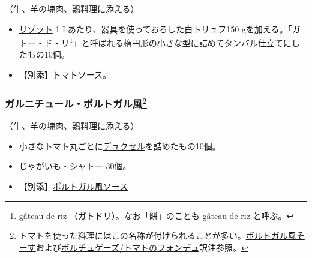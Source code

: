 \begin{recette}


（牛、羊の塊肉、鶏料理に添える）

\begin{itemize}
\item
  \protect\hyperlink{rizotto-piemontaise}{リゾット} 1
  Lあたり、器具を使っておろした白トリュフ150
  gを加える。「ガトー・ド・リ\footnote{gâteau de riz
    （ガトドリ）。なお「餅」のことも gâteau de riz と呼ぶ。}」と呼ばれる楕円形の小さな型に詰めてタンバル仕立てにしたもの10個。
\item
  【別添】\protect\hyperlink{sauce-tomate}{トマトソース}。
\end{itemize}

\atoaki{}

\hypertarget{garniture-portugaise}{%
\subsubsection[ガルニチュール・ポルトガル風]{\texorpdfstring{ガルニチュール・ポルトガル風\footnote{トマトを使った料理にはこの名称が付けられることが多い。\protect\hyperlink{sauce-portugaise}{ポルトガル風そーす}および\protect\hyperlink{portugaise}{ポルチュゲーズ/トマトのフォンデュ}訳注参照。}}{ガルニチュール・ポルトガル風}}\label{garniture-portugaise}}



（牛、羊の塊肉、鶏料理に添える）

\begin{itemize}
\item
  小さなトマト丸ごとに\protect\hyperlink{duxelles-seche}{デュクセル}を詰めたもの10個。
\item
  \protect\hyperlink{pommes-de-terre-chateau}{じゃがいも・シャトー}
  30個。
\item
  【別添】\protect\hyperlink{sauce-portugaise}{ポルトガル風ソース}
\end{itemize}


\end{recette}
